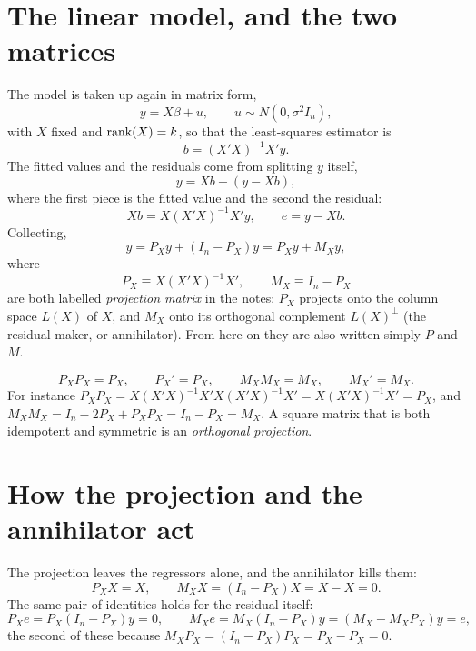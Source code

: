 \documentclass[11pt]{article}
\begin{document}

\section{The linear model, and the two matrices}

The model is taken up again in matrix form,
\[ y = X\beta + u, \qquad u \sim N(0,\sigma^{2}I_{n}), \]
with $X$ fixed and $\operatorname{rank}(X)=k$, so that the least-squares estimator is
\[ b = (X'X)^{-1}X'y . \]
The fitted values and the residuals come from splitting $y$ itself,
\[ y = Xb + (y - Xb), \]
where the first piece is the fitted value and the second the residual:
\[ Xb = X(X'X)^{-1}X'y, \qquad e = y - Xb . \]
Collecting,
\[ y = P_{X}y + (I_{n} - P_{X})y = P_{X}y + M_{X}y , \]
where
\[ P_{X} \equiv X(X'X)^{-1}X', \qquad M_{X} \equiv I_{n} - P_{X} \]
are both labelled \emph{projection matrix} in the notes: $P_{X}$ projects onto
the column space $L(X)$ of $X$, and $M_{X}$ onto its orthogonal complement
$L(X)^{\perp}$ (the residual maker, or annihilator). From here on they are also
written simply $P$ and $M$.

\[ P_{X}P_{X} = P_{X}, \qquad P_{X}' = P_{X}, \qquad M_{X}M_{X} = M_{X},
   \qquad M_{X}' = M_{X}. \]
For instance $P_{X}P_{X} = X(X'X)^{-1}X'X(X'X)^{-1}X' = X(X'X)^{-1}X' = P_{X}$, and
$M_{X}M_{X} = I_{n} - 2P_{X} + P_{X}P_{X} = I_{n} - P_{X} = M_{X}$.
A square matrix that is both idempotent and symmetric is an \emph{orthogonal
projection}.

\section{How the projection and the annihilator act}

The projection leaves the regressors alone, and the annihilator kills them:
\[ P_{X}X = X, \qquad M_{X}X = (I_{n} - P_{X})X = X - X = 0 . \]
The same pair of identities holds for the residual itself:
\[ P_{X}e = P_{X}(I_{n} - P_{X})y = 0, \qquad
   M_{X}e = M_{X}(I_{n} - P_{X})y = (M_{X} - M_{X}P_{X})y = e , \]
the second of these because $M_{X}P_{X} = (I_{n} - P_{X})P_{X} = P_{X} - P_{X} = 0$.
\end{document}
